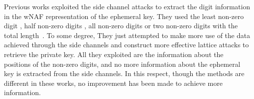 %



Previous works exploited the side channel attacks to extract the digit information in the wNAF representation of the ephemeral key.
They used the least non-zero digit \cite{Benger2014}, half non-zero digits \cite{Van2015}, all non-zero digits \cite{Fan2016} or two non-zero digits with the total length~\cite{Wang2017}.
To some degree,
They just attempted to make more use of the data achieved through the side channels and construct more effective lattice attacks to retrieve the private key.
All they exploited are the information about the positions of the non-zero digits, 
 and no more information about the ephemeral key is extracted from the side channels.
In this respect, though the methods are different in these works, no improvement has been made to achieve more information.

